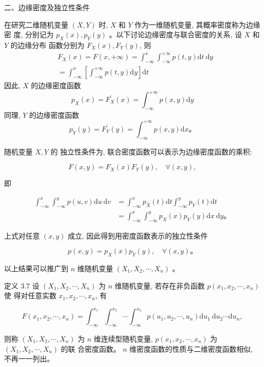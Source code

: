 \documentclass{beamer}
\begin{document}
	\begin{frame}
		二、边缘密度及独立性条件
		
		在研究二维随机变量 $(X, Y)$ 时, $X$ 和 $Y$ 作为一维随机变量, 其概率密度称为边缘密 度, 分别记为 $p_{X}(x), p_{Y}(y)$ 。以下讨论边缘密度与联合密度的关系, 设 $X$ 和 $Y$ 的边缘分布 函数分别为 $F_{X}(x), F_{Y}(y)$, 则
		\begin{align}
			&F_{X}(x)=F(x,+\infty)=\int_{-\infty}^{x} \int_{-\infty}^{+\infty} p(t, y) \mathrm{d} t \mathrm{~d} y \\
			&=\int_{-\infty}^{x}\left[\int_{-\infty}^{+\infty} p(t, y) \mathrm{d} y\right] \mathrm{d} t
		\end{align}
		因此, $X$ 的边缘密度函数	
		$$
		p_{X}(x)=F_{X}^{\prime}(x)=\int_{-\infty}^{+\infty} p(x, y) \mathrm{d} y
		$$
		同理, $Y$ 的边缘密度函数
		$$
		p_{Y}(y)=F_{Y}^{\prime}(y)=\int_{-\infty}^{+\infty} p(x, y) \mathrm{d} x 。
		$$
	\end{frame}
	
	\begin{frame}
		随机变量 $X, Y$ 的 独立性条件为, 联合密度函数可以表示为边缘密度函数的乘积:
		
		$$
		F(x, y)=F_{X}(x) F_{Y}(y), \quad \forall(x, y),
		$$
		
		即
		
		$$
		\begin{aligned}
			\int_{-\infty}^{x} \int_{-\infty}^{y} p(u, v) \mathrm{d} u \mathrm{~d} v & =\int_{-\infty}^{x} p_{X}(t) \mathrm{d} t \int_{-\infty}^{y} p_{Y}(t) \mathrm{d} t \\
			& =\int_{-\infty}^{x} \int_{-\infty}^{y} p_{X}(x) p_{Y}(y) \mathrm{d} x \mathrm{~d} y 。
		\end{aligned}
		$$
		
		上式对任意 $(x, y)$ 成立, 因此得到用密度函数表示的独立性条件
		
		$$
		p(x, y)=p_{X}(x) p_{Y}(y), \quad \forall(x, y) 。
		$$
	\end{frame}
	
	\begin{frame}
		以上结果可以推广到 $n$ 维随机变量 $\left(X_{1}, X_{2}, \cdots, X_{n}\right)$ 。 
		
		定义 3.7 设 $\left(X_{1}, X_{2}, \cdots, X_{n}\right)$ 为 $n$ 维随机变量, 若存在非负函数 $p\left(x_{1}, x_{2}, \cdots, x_{n}\right)$ 使 得对任意实数 $x_{1}, x_{2}, \cdots, x_{n}$, 有
		
		$$
		F\left(x_{1}, x_{2}, \cdots, x_{n}\right)=\int_{-\infty}^{x_{1}} \int_{-\infty}^{x_{2}} \cdots \int_{-\infty}^{x_{n}} p\left(u_{1}, u_{2}, \cdots, u_{n}\right) \mathrm{d} u_{1} \mathrm{~d} u_{2} \cdots \mathrm{d} u_{n},
		$$
		
		则称 $\left(X_{1}, X_{2}, \cdots, X_{n}\right)$ 为 $n$ 维连续型随机变量, $p\left(x_{1}, x_{2}, \cdots, x_{n}\right)$ 为 $\left(X_{1}, X_{2}, \cdots, X_{n}\right)$ 的联 合密度函数。 $n$ 维密度函数的性质与二维密度函数相似, 不再一一列出。
	\end{frame}
	
\end{document}
